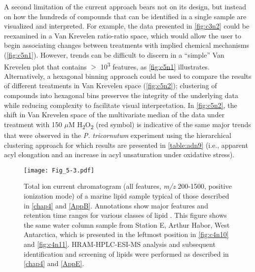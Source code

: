 A second limitation of the current approach bears not on its design, but instead on how the hundreds of compounds that can be identified in a single sample are visualized and interpreted. For example, the data presented in \autoref{fig:c3n2} could be reexamined in a Van Krevelen ratio-ratio space, which would allow the user to begin associating changes between treatments with implied chemical mechanisms (\autoref{fig:c5n1}). However, trends can be difficult to discern in a ``simple'' Van Krevelen plot that contains $>$ 10\textsuperscript{3} features, as \autoref{fig:c5n1} illustrates. Alternatively, a hexagonal binning approach could be used to compare the results of different treatments in Van Krevelen space (\autoref{fig:c5n2}); clustering of compounds into hexagonal bins preserves the integrity of the underlying data while reducing complexity to facilitate visual interpretation. In \autoref{fig:c5n2}, the shift in Van Krevelen space of the multivariate median of the data under treatment with 150 $\mu$M H\textsubscript{2}O\textsubscript{2} (red symbol) is indicative of the same major trends that were observed in the \emph{P. tricornutum} experiment using the hierarchical clustering approach for which results are presented in \autoref{table:adn9} (i.e., apparent acyl elongation and an increase in acyl unsaturation under oxidative stress).

\begin{figure}[!th]
\centering
\texttt{[image: Fig\_5-3.pdf]}
\caption[Total ion current chromatogram of a typical marine lipid sample, with annotation of major features]{Total ion current chromatogram (all features, \emph{m/z} 200-1500, positive ionization mode) of a marine lipid sample typical of those described in \autoref{chap4} and \autoref{AppB}. Annotations show major features and retention time ranges for various classes of lipid . This figure shows the same water column sample from Station E, Arthur Habor, West Antarctica, which is presented in the leftmost position in \autoref{fig:c4n10} and \autoref{fig:c4n11}. HRAM-HPLC-ESI-MS analysis and subsequent identification and screening of lipids were performed as described in \autoref{chap4} and \autoref{AppE}.}
\label{fig:c5n3}
\end{figure}

